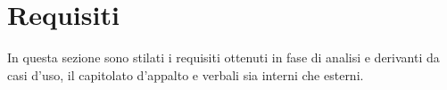 \documentclass[12pt, oneside]{article}
\begin{document}




































\newpage











%
%

%

%

\section{Requisiti}
In questa sezione sono stilati i requisiti ottenuti in fase di analisi e derivanti da casi d'uso, il capitolato d'appalto e verbali sia interni che esterni. 
\end{document}
